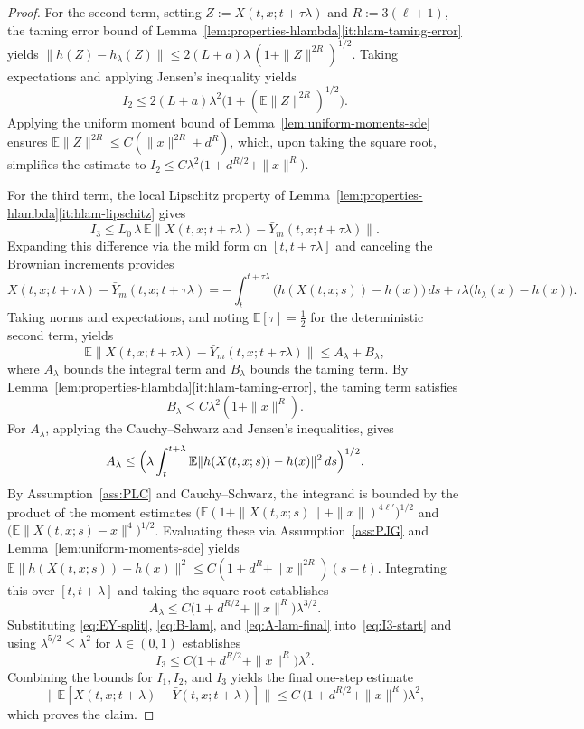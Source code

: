 \documentclass[11pt,a4paper,reqno]{amsart}
\theoremstyle{plain}
\theoremstyle{definition}
\theoremstyle{remark}
\newcommand{\E}{\mathbb{E}}
\begin{document}
\begin{proof}
For the second term, setting $Z:=X(t,x;t+\tau\lambda)$ and $R:=3(\ell+1)$, the taming error bound of Lemma~\ref{lem:properties-hlambda}\ref{it:hlam-taming-error} yields $\|h(Z)-h_\lambda(Z)\|\le 2(L+a)\lambda\,(1+\|Z\|^{2R})^{1/2}$. Taking expectations and applying Jensen's inequality yields
\[
  I_2 \le 2(L+a)\lambda^2\bigl(1+(\E\|Z\|^{2R})^{1/2}\bigr).
\]
Applying the uniform moment bound of Lemma~\ref{lem:uniform-moments-sde} ensures $\E\|Z\|^{2R}\le C(\|x\|^{2R}+d^R)$, which, upon taking the square root, simplifies the estimate to $I_2\le C\lambda^2\bigl(1+d^{R/2}+\|x\|^R\bigr)$.

For the third term, the local Lipschitz property of Lemma~\ref{lem:properties-hlambda}\ref{it:hlam-lipschitz} gives
\begin{equation}\label{eq:I3-start}
  I_3 \le L_0\,\lambda\,\E\bigl\|X(t,x;t+\tau\lambda)-\bar Y_m(t,x;t+\tau\lambda)\bigr\|.
\end{equation}
Expanding this difference via the mild form on $[t,t+\tau\lambda]$ and canceling the Brownian increments provides
\[
  X(t,x;t+\tau\lambda)-\bar Y_m(t,x;t+\tau\lambda) = -\int_t^{t+\tau\lambda}\bigl(h(X(t,x;s))-h(x)\bigr)\,ds +\tau\lambda\bigl(h_\lambda(x)-h(x)\bigr).
\]
Taking norms and expectations, and noting $\E[\tau]=\tfrac12$ for the deterministic second term, yields
\begin{equation}\label{eq:EY-split}
  \E\bigl\|X(t,x;t+\tau\lambda)-\bar Y_m(t,x;t+\tau\lambda)\bigr\| \le A_\lambda+B_\lambda,
\end{equation}
where $A_\lambda$ bounds the integral term and $B_\lambda$ bounds the taming term. By Lemma~\ref{lem:properties-hlambda}\ref{it:hlam-taming-error}, the taming term satisfies
\begin{equation}\label{eq:B-lam}
  B_\lambda\le C\lambda^2(1+\|x\|^{R}).
\end{equation}
For $A_\lambda$, applying the Cauchy--Schwarz and Jensen's inequalities, gives
\[
  A_\lambda \le \Bigl(\lambda\int_t^{t+\lambda}\E\|h(X(t,x;s))-h(x)\|^2\,ds\Bigr)^{1/2}.
\]
By Assumption~\ref{ass:PLC} and Cauchy--Schwarz, the integrand is bounded by the product of the moment estimates $\bigl(\E(1+\|X(t,x;s)\|+\|x\|)^{4\ell'}\bigr)^{1/2}$ and $\bigl(\E\|X(t,x;s)-x\|^{4}\bigr)^{1/2}$. Evaluating these via Assumption~\ref{ass:PJG} and Lemma~\ref{lem:uniform-moments-sde} yields $\E\|h(X(t,x;s))-h(x)\|^2 \le C(1+d^R+\|x\|^{2R})(s-t)$. Integrating this over $[t, t+\lambda]$ and taking the square root establishes
\begin{equation}\label{eq:A-lam-final}
  A_\lambda \le C\bigl(1+d^{R/2}+\|x\|^R\bigr)\lambda^{3/2}.
\end{equation}
Substituting \eqref{eq:EY-split}, \eqref{eq:B-lam}, and \eqref{eq:A-lam-final} into~\eqref{eq:I3-start} and using $\lambda^{5/2}\le\lambda^2$ for $\lambda\in(0,1)$ establishes 
\[
I_3\le C\bigl(1+d^{R/2}+\|x\|^R\bigr)\lambda^2
.\]
Combining the bounds for $I_1, I_2$, and $I_3$ yields the final one-step estimate
\[
  \bigl\|\E[X(t,x;t+\lambda)-\bar Y(t,x;t+\lambda)]\bigr\| \le C\,\bigl(1+d^{R/2}+\|x\|^R\bigr)\lambda^2,
\]
which proves the claim.
\end{proof}
\end{document}
